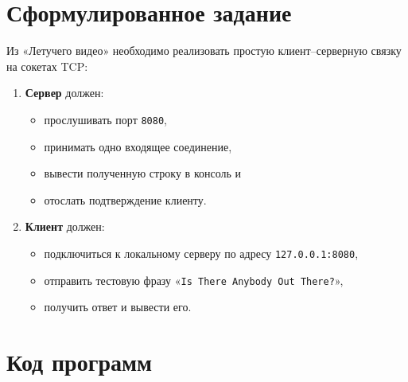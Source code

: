 \documentclass[a4paper,14pt]{extarticle}
\begin{document}
\section{Сформулированное задание}
Из «Летучего видео» необходимо реализовать простую клиент--серверную
связку на сокетах TCP:
\begin{enumerate}[nosep]
  \item \textbf{Сервер} должен:
        \begin{itemize}[nosep]
          \item прослушивать порт \texttt{8080},
          \item принимать одно входящее соединение,
          \item вывести полученную строку в консоль и
          \item отослать подтверждение клиенту.
        \end{itemize}
  \item \textbf{Клиент} должен:
        \begin{itemize}[nosep]
          \item подключиться к локальному серверу по адресу
                \texttt{127.0.0.1:8080},
          \item отправить тестовую фразу
                «\texttt{Is There Anybody Out There?}»,
          \item получить ответ и вывести его.
        \end{itemize}
\end{enumerate}

\section{Код программ}\label{sect:listings}
\end{document}
